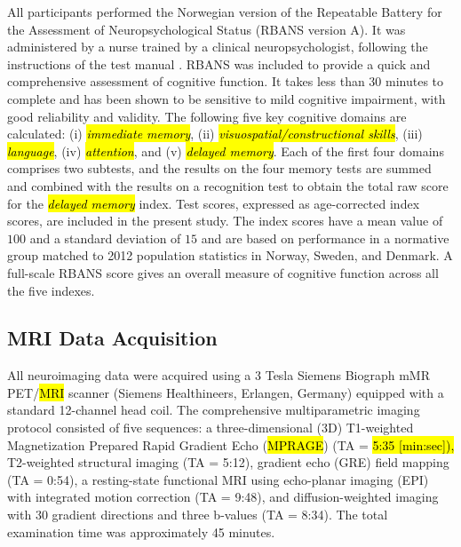 \documentclass[diagnostics,article,accept,pdftex,moreauthors]{Definitions/mdpi}
\begin{document}
\vspace{1mm}

  
All participants performed the Norwegian version of the Repeatable Battery for the Assessment of Neuropsychological Status (RBANS version A).  It was administered by a nurse trained by a clinical neuropsychologist, following the instructions of the test manual \cite{randolph2013rbans}. RBANS was included to provide a quick and comprehensive assessment of cognitive function. It takes less than 30 minutes to complete and has been shown to be sensitive to mild cognitive impairment, with good reliability and validity. The following five key cognitive domains are calculated: 
(i) \textit{\hl{immediate memory}}, (ii) \textit{\hl{visuospatial/constructional skills}}, (iii) \textit{\hl{language}}, (iv) \textit{\hl{attention}}, and (v) \textit{\hl{delayed memory}}. Each of the first four domains comprises two subtests, and the results on the four memory tests are summed and combined with the results on a recognition test to obtain the total raw score for the \textit{\hl{delayed memory}} index.  Test scores, expressed as age-corrected index scores, are included in the present study. The index scores have a mean value of $100$ and a standard deviation of $15$ and are based on performance in a normative group matched to 2012 population statistics in Norway, Sweden, and Denmark. A full-scale RBANS score gives an overall measure of cognitive function across all the five indexes.  


\subsection{MRI Data Acquisition}
All neuroimaging data were acquired using a 3 Tesla Siemens Biograph mMR PET/\hl{MRI} %
scanner (Siemens Healthineers, Erlangen, Germany) equipped with a standard 12-channel head coil. The comprehensive multiparametric imaging protocol consisted of five sequences: a three-dimensional (3D) T1-weighted Magnetization Prepared Rapid Gradient Echo (\hl{MPRAGE}) %
 (TA = \hl{5:35 [min:sec]),} %
T2-weighted structural imaging (TA = 5:12), gradient echo (GRE) field mapping (TA = 0:54), a resting-state functional MRI using echo-planar imaging (EPI) with integrated motion correction (TA = 9:48), and diffusion-weighted imaging with 30 gradient directions and three b-values (TA = 8:34). The total examination time was approximately 45 minutes.
\end{document}
